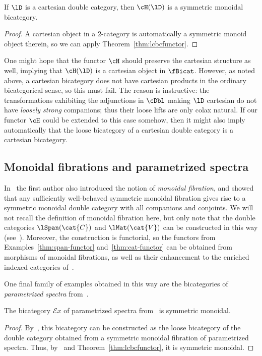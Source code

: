 \begin{thm}
  If $\lD$ is a cartesian double category, then $\cH(\lD)$ is a symmetric monoidal bicategory.
\end{thm}
\begin{proof}
  A cartesian object in a 2-category is automatically a symmetric monoid object therein, so we can apply Theorem~\ref{thm:lcbcfunctor}.
\end{proof}

One might hope that the functor $\cH$ should preserve the cartesian structure as well, implying that $\cH(\lD)$ is a cartesian object in $\fBicat$.
However, as noted above, a cartesian bicategory does not have cartesian products in the ordinary bicategorical sense, so this must fail.
The reason is instructive: the transformations exhibiting the adjunctions in $\cDbl$ making $\lD$ cartesian do not have \emph{loosely strong} companions; thus their loose lifts are only colax natural.
If our functor $\cH$ could be extended to this case somehow, then it might also imply automatically that the loose bicategory of a cartesian double category is a cartesian bicategory.


\subsection{Monoidal fibrations and parametrized spectra}
\label{sec:mfps}

In~\cite{shulman:frbi} the first author also introduced the notion of \emph{monoidal fibration}, and showed that any sufficiently well-behaved symmetric monoidal fibration gives rise to a symmetric monoidal double category with all companions and conjoints.
We will not recall the definition of monoidal fibration here, but only note that the double categories $\lSpan(\cat{C})$ and $\lMat(\cat{V})$ can be constructed in this way (see~\cite[Examples 15.3 and 15.4]{shulman:frbi}).
Moreover, the construction is functorial, so the functors from Examples~\ref{thm:span-functor} and~\ref{thm:cat-functor} can be obtained from morphisms of monoidal fibrations, as well as their enhancement to the enriched indexed categories of~\cite{shulman:eicats}.

One final family of examples obtained in this way are the bicategories of \emph{parametrized spectra} from~\cite{maysig:pht}.

\begin{thm}
  The bicategory $\mathcal{E}\mathit{x}$ of parametrized spectra from~\cite[Chapter 17]{maysig:pht} is symmetric monoidal.
\end{thm}
\begin{proof}
  By~\cite[Example 14.6]{shulman:frbi}, this bicategory can be constructed as the loose bicategory of the double category obtained from a symmetric monoidal fibration of parametrized spectra.
  Thus, by~\cite[Theorem 14.2]{shulman:frbi} and Theorem~\ref{thm:lcbcfunctor}, it is symmetric monoidal.
\end{proof}

